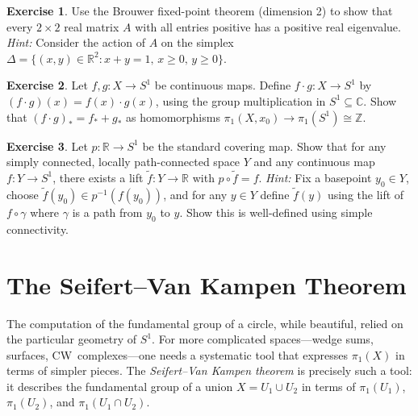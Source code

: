 \documentclass[12pt,a4paper,openany]{book}
\theoremstyle{definition}
\newtheorem{exercise}{Exercise}[chapter]
\theoremstyle{plain}
\theoremstyle{remark}
\newcommand{\Z}{\mathbb{Z}}
\newcommand{\R}{\mathbb{R}}
\newcommand{\C}{\mathbb{C}}
\begin{document}
\begin{exercise}\label{exo:ch2-8}
Use the Brouwer fixed-point theorem (dimension 2) to show that every $2 \times
2$ real matrix $A$ with all entries positive has a positive real eigenvalue.
\emph{Hint:} Consider the action of $A$ on the simplex $\Delta = \{(x,y) \in
\R^2 : x + y = 1,\, x \ge 0,\, y \ge 0\}$.
\end{exercise}

\begin{exercise}\label{exo:ch2-9}
Let $f, g \colon X \to S^1$ be continuous maps. Define $f \cdot g \colon X \to
S^1$ by $(f \cdot g)(x) = f(x) \cdot g(x)$, using the group multiplication in
$S^1 \subseteq \C$. Show that $(f \cdot g)_* = f_* + g_*$ as homomorphisms
$\pi_1(X, x_0) \to \pi_1(S^1) \cong \Z$.
\end{exercise}

\begin{exercise}\label{exo:ch2-10}
Let $p \colon \R \to S^1$ be the standard covering map. Show that for any simply
connected, locally path-connected space $Y$ and any continuous map $f \colon Y
\to S^1$, there exists a lift $\tilde{f} \colon Y \to \R$ with $p \circ
\tilde{f} = f$. \emph{Hint:} Fix a basepoint $y_0 \in Y$, choose $\tilde{f}(y_0)
\in p^{-1}(f(y_0))$, and for any $y \in Y$ define $\tilde{f}(y)$ using the lift
of $f \circ \gamma$ where $\gamma$ is a path from $y_0$ to $y$. Show this is
well-defined using simple connectivity.
\end{exercise}




\chapter{The Seifert--Van Kampen Theorem}\label{ch:svk}

The computation of the fundamental group of a circle, while beautiful, relied
on the particular geometry of $S^1$.  For more complicated spaces---wedge sums,
surfaces, CW~complexes---one needs a systematic tool that expresses
$\pi_1(X)$ in terms of simpler pieces.  The \emph{Seifert--Van Kampen
theorem} is precisely such a tool: it
describes the fundamental group of a union $X = U_1 \cup U_2$ in terms of
$\pi_1(U_1)$, $\pi_1(U_2)$, and $\pi_1(U_1 \cap U_2)$.
\end{document}
